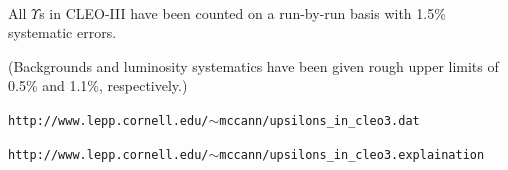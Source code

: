 \documentclass[landscape]{article}
\begin{document}
\pagebreak

\mbox{ }

\vspace{-\baselineskip}

\vfill

All $\Upsilon$s in CLEO-III have been counted on a run-by-run basis
with 1.5\% systematic errors.


\vfill

(Backgrounds and luminosity systematics have been given rough upper
limits of 0.5\% and 1.1\%, respectively.)

\vfill

{\tt http://www.lepp.cornell.edu/$\sim$mccann/upsilons\_in\_cleo3.dat}

{\tt http://www.lepp.cornell.edu/$\sim$mccann/upsilons\_in\_cleo3.explaination}

\vfill
\end{document}
